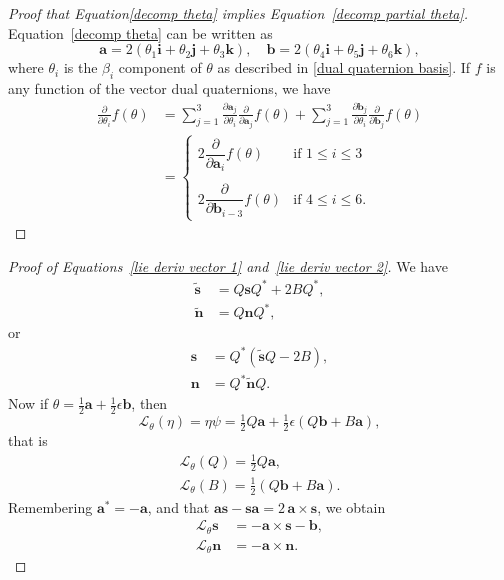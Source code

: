\documentclass[reqno,12pt]{amsart}
\newcommand{\liederiv}{\mathcal L}
\begin{document}
\begin{proof}[Proof that Equation\eqref{decomp theta} implies Equation~\eqref{decomp partial theta}]
Equation~\eqref{decomp theta} can be written as
\begin{equation}
\bm a = 2(\theta_1 \bm i + \theta_2 \bm j + \theta_3 \bm k), \quad
\bm b = 2(\theta_4 \bm i + \theta_5 \bm j + \theta_6 \bm k),
\end{equation}
where $\theta_i$ is the $\beta_i$ component of $\theta$ as described in \eqref{dual quaternion basis}.  If $f$ is any function of the vector dual quaternions, we have
\begin{equation}
\begin{aligned}
\frac{\partial}{\partial \theta_i} f(\theta)
&= \sum_{j=1}^3 \frac{\partial \bm a_j}{\partial \theta_i} \frac{\partial}{\partial \bm a_j} f(\theta)
+ \sum_{j=1}^3 \frac{\partial \bm b_j}{\partial \theta_i} \frac{\partial}{\partial \bm b_j} f(\theta)
\\&
= \begin{cases}
2 \dfrac{\partial}{\partial \bm a_i} f(\theta) & \text{if $1 \le i \le 3$} \\ \\
2 \dfrac{\partial}{\partial \bm b_{i-3}} f(\theta) & \text{if $4 \le i \le 6$.}
\end{cases}
\end{aligned}
\end{equation}
\end{proof}

\begin{proof}[Proof of Equations~\eqref{lie deriv vector 1} and~\eqref{lie deriv vector 2}]
We have
\begin{align}
\tilde{\bm s} &= Q \bm s Q^* + 2 B Q^* , \\
\tilde{\bm n} &= Q \bm n Q^*,
\end{align}
or
\begin{align}
\bm s &= Q^* (\tilde{\bm s} Q - 2 B ) , \\
\bm n &= Q^* \tilde{\bm n} Q .
\end{align}
Now if $\theta = \tfrac12 \bm a + \tfrac12\epsilon\bm b$, then
\begin{equation}
\liederiv_\theta(\eta) = \eta\psi = \tfrac12 Q \bm a + \tfrac12 \epsilon (Q \bm b + B \bm a),
\end{equation}
that is
\begin{gather}
\liederiv_\theta(Q) = \tfrac12 Q \bm a, \\
\liederiv_\theta(B) = \tfrac12 (Q \bm b + B \bm a) .
\end{gather}
Remembering $\bm a^* = -\bm a$, and that $\bm a \bm s - \bm s \bm a = 2 \,\bm a \times \bm s$, we obtain
\begin{align}
\mathcal L_\theta \bm s &= -\bm a \times \bm s - \bm b ,\\
\mathcal L_\theta \bm n &= - \bm a \times \bm n .
\end{align}
\end{proof}
\end{document}
